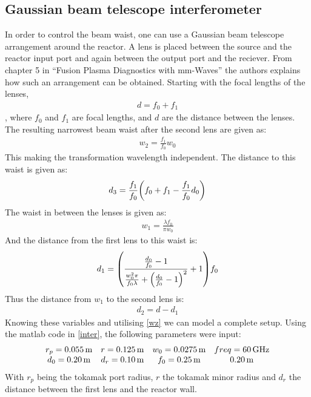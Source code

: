 \subsection{Gaussian beam telescope interferometer}
In order to control the beam waist, one can use a Gaussian beam telescope arrangement around the reactor. A lens is placed between the source and the reactor input port and again between the output port and the reciever. From chapter 5 in ``Fusion Plasma Diagnostics with mm-Waves''\cite{PlasmaDiagnosis} the authors explains how such an arrangement can be obtained. Starting with the focal lengths of the lenses,
\begin{align}
	d = f_0 + f_1
\end{align}
, where \(f_0\) and \(f_1\) are focal lengths, and \(d\) are the distance between the lenses.
The resulting narrowest beam waist after the second lens are given as:
\begin{align}
	w_2 = \frac{f_1}{f_0}w_0
\end{align}
This making the transformation wavelength independent\cite[Eq 5.118]{PlasmaDiagnosis}.
The distance to this waist is given as:
\begin{align}
	d_3 = \frac{f_1}{f_0}\pqty{f_0+f_1-\frac{f_1}{f_0}d_0}
\end{align}
The waist in between the lenses is given as:
\begin{align}
	w_1 = \frac{\lambda f_0}{\pi w_0}
\end{align}
And the distance from the first lens to this waist is:
\begin{align}
	d_1 = \pqty{\frac{\frac{d_0}{f_0}-1}{\frac{w_0^2\pi}{f_0\lambda}+\pqty{\frac{d_0}{f_0}-1}^2}+1}f_0
\end{align}
Thus the distance from \(w_1\) to the second lens is:
\begin{align}
	d_2 = d-d_1
\end{align}
Knowing these variables and utilising \cref{wz} we can model a complete setup. Using the matlab code in \cref{inter}, the following parameters were input:
\begin{align}
	\mqty{r_p = \SI{0.055}{\meter} & r = \SI{0.125}{\meter}  & w_0 = \SI{0.0275}{\meter} & freq = \SI{60}{\giga\hertz}        \\
	d_0 = \SI{0.20}{\meter}        & d_r = \SI{0.10}{\meter} & f_0 = \SI{0.25}{\meter}   & \SI{0.20}{\meter}} \label{interin}
\end{align}
With \(r_p\) being the tokamak port radius, \(r\) the tokamak minor radius and \(d_r\) the distance between the first lens and the reactor wall.
